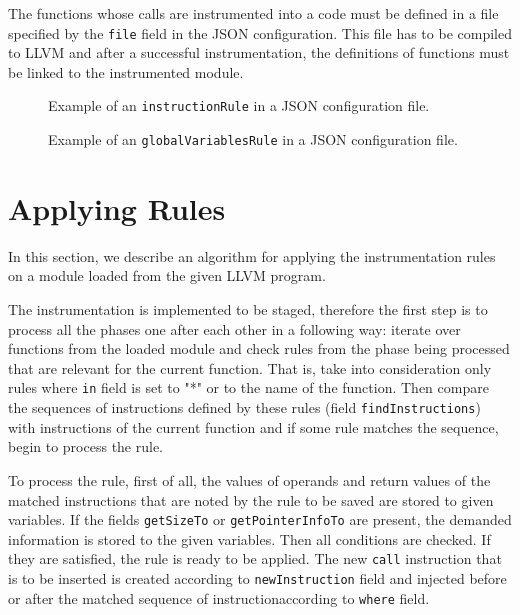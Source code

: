 The functions whose calls are instrumented into a code must be defined in a
file specified by the \texttt{file} field in the JSON configuration. This file
has to be compiled to LLVM and after a successful instrumentation, the
definitions of functions must be linked to the instrumented module.

\begin{figure}[h]

\caption{Example of an \texttt{instructionRule} in a JSON configuration file.}
\label{fig:json_example}
\end{figure}

\begin{figure}[h]

\caption{Example of an \texttt{globalVariablesRule} in a JSON configuration file.}
\label{fig:json_example2}
\end{figure}


\section{Applying Rules}

In this section, we describe an algorithm for applying the instrumentation
rules on a module loaded from the given LLVM program.


The instrumentation is implemented to be staged, therefore the first step is to
process all the phases one after each other in a following way: iterate over
functions from the loaded module and check rules from the phase being processed
that are relevant for the current function. That is, take into consideration
only rules where \texttt{in} field is set to "*" or to the name of the
function. Then compare the sequences of instructions defined by these rules
(field \texttt{findInstructions}) with instructions of the current function and
if some rule matches the sequence, begin to process the rule.

To process the rule, first of all, the values of operands and return values of
the matched instructions that are noted by the rule to be saved are stored to
given variables. If the fields \texttt{getSizeTo} or \texttt{getPointerInfoTo}
are present, the demanded information is stored to the given variables. Then
all conditions are checked. If they are satisfied, the rule is ready to be
applied. The new \texttt{call} instruction that is to be inserted is created
according to \texttt{newInstruction} field and injected before or after the
matched sequence of instructionaccording to \texttt{where} field.

